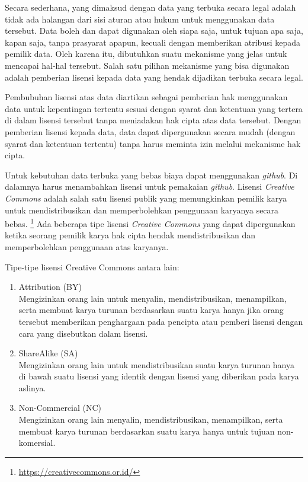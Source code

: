 Secara sederhana, yang dimaksud dengan data yang terbuka secara legal adalah tidak ada halangan dari sisi aturan atau hukum untuk menggunakan data tersebut. Data boleh dan dapat digunakan oleh siapa saja, untuk tujuan apa saja, kapan saja, tanpa prasyarat apapun, kecuali dengan memberikan atribusi kepada pemilik data. Oleh karena itu, dibutuhkan suatu mekanisme yang jelas untuk mencapai hal-hal tersebut. Salah satu pilihan mekanisme yang bisa digunakan adalah pemberian lisensi kepada data yang hendak dijadikan terbuka secara legal.   

Pembubuhan lisensi atas data diartikan sebagai pemberian hak menggunakan data untuk kepentingan tertentu sesuai dengan syarat dan ketentuan yang tertera di dalam lisensi tersebut tanpa meniadakan hak cipta atas data tersebut. Dengan pemberian lisensi kepada data, data dapat dipergunakan secara mudah (dengan syarat dan ketentuan tertentu) tanpa harus meminta izin melalui mekanisme hak cipta. 

Untuk kebutuhan data terbuka yang bebas biaya dapat menggunakan \textit{github}. Di dalamnya harus menambahkan lisensi untuk pemakaian \textit{github}. Lisensi \textit{Creative Commons} adalah salah satu lisensi publik yang memungkinkan pemilik karya untuk mendistribusikan dan memperbolehkan penggunaan karyanya secara bebas. \footnote{\url{https://creativecommons.or.id/}} Ada beberapa tipe lisensi \textit{Creative Commons} yang dapat dipergunakan ketika seorang pemilik karya hak cipta hendak mendistribusikan dan memperbolehkan penggunaan atas karyanya.  

Tipe-tipe lisensi Creative Commons antara lain:
\begin{enumerate}
\item Attribution (BY) \\
Mengizinkan orang lain untuk menyalin, mendistribusikan, menampilkan, serta membuat karya turunan berdasarkan suatu karya hanya jika orang tersebut memberikan penghargaan pada pencipta atau pemberi lisensi dengan cara yang disebutkan dalam lisensi.
\item ShareAlike (SA) \\
Mengizinkan orang lain untuk mendistribusikan suatu karya turunan hanya di bawah suatu lisensi yang identik dengan lisensi yang diberikan pada karya aslinya. 
\item Non-Commercial (NC) \\
Mengizinkan orang lain menyalin, mendistribusikan, menampilkan, serta membuat karya turunan berdasarkan suatu karya hanya untuk tujuan non-komersial.
\end{enumerate}

